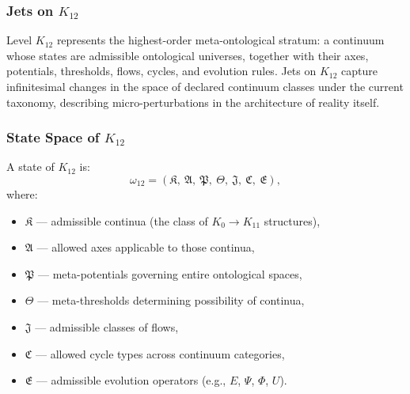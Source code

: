 
\subsubsection{Jets on $K_{12}$}
\label{sec:jets-k12}

Level $K_{12}$ represents the highest-order meta-ontological stratum:
a continuum whose states are admissible ontological universes,
together with their axes, potentials, thresholds, flows, cycles, and
evolution rules. Jets on $K_{12}$ capture infinitesimal changes in the
space of declared continuum classes under the current taxonomy, describing micro-perturbations in the
architecture of reality itself.


\subsubsection{State Space of $K_{12}$}

A state of $K_{12}$ is:
\[
\omega_{12} =
(\mathfrak{K},\ \mathfrak{A},\ \mathfrak{P},\ \mathfrak{\Theta},\ 
 \mathfrak{J},\ \mathfrak{C},\ \mathfrak{E}),
\]
where:
\begin{itemize}
    \item $\mathfrak{K}$ — admissible continua (the class of $K_0\!\to\!K_{11}$ structures),
    \item $\mathfrak{A}$ — allowed axes applicable to those continua,
    \item $\mathfrak{P}$ — meta-potentials governing entire ontological spaces,
    \item $\mathfrak{\Theta}$ — meta-thresholds determining possibility of continua,
    \item $\mathfrak{J}$ — admissible classes of flows,
    \item $\mathfrak{C}$ — allowed cycle types across continuum categories,
    \item $\mathfrak{E}$ — admissible evolution operators (e.g., $E$, $\Psi$, $\Phi$, $U$).
\end{itemize}

